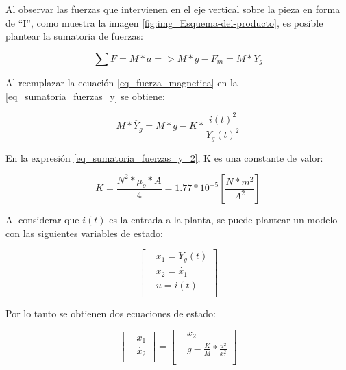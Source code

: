 \noindent Al observar las fuerzas que intervienen en el eje vertical sobre la pieza en forma de ``I'', como muestra la imagen \ref{fig:img_Esquema-del-producto}, es posible plantear la sumatoria de fuerzas:

\begin{equation}\label{eq_sumatoria_fuerzas_y}
	\sum F=M*a=>M*g-F_{m}=M*\ddot{Y_g}
\end{equation}

\noindent Al reemplazar la ecuación \ref{eq_fuerza_magnetica} en la \ref{eq_sumatoria_fuerzas_y} se obtiene:

\begin{equation}\label{eq_sumatoria_fuerzas_y_2}
	M*\ddot{Y_g}=M*g-K*\frac{i(t)^{2}}{Y_g(t)^{2}}
\end{equation}

\noindent En la expresión \ref{eq_sumatoria_fuerzas_y_2}, K es una constante de valor:

\begin{equation}
	K=\frac{N^{2}*\mu_{o}*A}{4}=1.77*10^{-5} [\frac{N*m^2}{A^2}]
\end{equation}

\noindent Al considerar que $i(t)$ es la entrada a la planta, se puede plantear un modelo con las siguientes variables de estado:

\begin{equation*}
	\begin{bmatrix} %
	&x_{1}=Y_g(t)\\
	&x_{2}=\dot{x_{1}}\\
	&u=i(t)\\
	\end{bmatrix}
\end{equation*}

\noindent Por lo tanto se obtienen dos ecuaciones de estado:

\begin{equation*}
	\begin{bmatrix} %
		&\dot{x_{1}}\\
		&\dot{x_{2}}\\
	\end{bmatrix}
=
	\begin{bmatrix} %
		&x_{2}\\
		&g-\frac{K}{M}*\frac{u^{2}}{x_{1}^{2}}\\
	\end{bmatrix}
\end{equation*}


